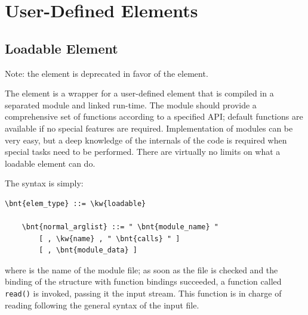 














\section{User-Defined Elements}\label{sec:EL:BASE:USER_DEFINED}

\subsection{Loadable Element}\label{sec:EL:BASE:USER_DEFINED:LOADABLE}
Note: the  element is deprecated in favor
of the  element.

The  element is a wrapper for a user-defined element that is
compiled in a separated module and linked run-time.
The module should provide a comprehensive set of functions according to 
a specified API; default functions are available if no special features
are required.
Implementation of modules can be very easy, but a deep knowledge of the
internals of the code is required when special tasks need to be performed. 
There are virtually no limits on what a loadable element can do.

The syntax is simply:
\begin{Verbatim}[commandchars=\\\{\}]
    \bnt{elem_type} ::= \kw{loadable}

    \bnt{normal_arglist} ::= " \bnt{module_name} "
        [ , \kw{name} , " \bnt{calls} " ] 
        [ , \bnt{module_data} ]
\end{Verbatim}
where  is the name of the module file; as soon as the file
is checked and the binding of the structure with function bindings 
succeeded, a function called \texttt{read()} is invoked, passing it the input
stream.
This function is in charge of reading  following the
general syntax of the input file.

